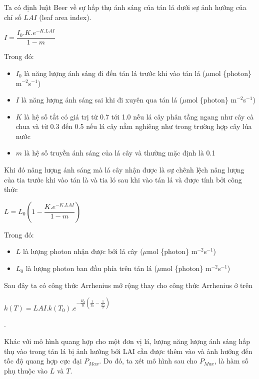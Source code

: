 \documentclass[a4paper]{article}
\begin{document}
    Ta có định luật Beer về sự hấp thụ ánh sáng của tán lá dưới sự ảnh hưởng của chỉ số $LAI$ (leaf area index).
    \begin{center}
        $I = \dfrac{I_0.K.e^{-K.LAI}}{1 - m}$
    \end{center}
    Trong đó:
    \begin{itemize}
        \item $I_0$ là năng lượng ánh sáng đi đến tán lá trước khi vào tán lá ($\mu$mol \{photon\} m$^{-2}$s$^{-1}$)
        \item $I$ là năng lượng ánh sáng sai khi đi xuyên qua tán lá ($\mu$mol \{photon\} m$^{-2}$s$^{-1}$)
        \item $K$ là hệ số tắt có giá trị từ 0.7 tới 1.0 nếu lá cây phân tầng ngang như cây cà chua và từ 0.3 đến 0.5 nếu lá cây nằm nghiêng như trong trường hợp cây lúa nước
        \item $m$ là hệ số truyền ánh sáng của lá cây và thường mặc định là 0.1
    \end{itemize}
    Khi đó năng lượng ánh sáng mà lá cây nhận được là sự chênh lệch năng lượng của tia trước khi vào tán là và tia ló sau khi vào tán lá và được tính bởi công thức
    \begin{center}
        $L = L_0 \left(1 - \dfrac{K.e^{-K.LAI}}{1 - m}\right)$
    \end{center}
    Trong đó:
    \begin{itemize}
        \item $L$ là lượng photon nhận được bởi lá cây ($\mu$mol \{photon\} m$^{-2}$s$^{-1}$)
        \item $L_0$ là lượng photon ban đầu phía trên tán lá ($\mu$mol \{photon\} m$^{-2}$s$^{-1}$)
    \end{itemize}
    
    Sau đây ta có công thức Arrhenius mở rộng thay cho công thức Arrhenius ở trên
    \begin{center}
        $k(T) = LAI.k(T_0).e^{-\frac{H_d}{R}\left(\frac{1}{T_0} - \frac{1}{\frac{H_d}{S}}\right)}$
    \end{center}.
    
    \vspace{5mm}
    
    Khác với mô hình quang hợp cho một đơn vị lá, lượng năng lượng ánh sáng hấp thụ vào trong tán lá bị ảnh hưởng bởi LAI cần được thêm vào và ảnh hưởng đến tốc độ quang hợp cực đại $P_{Max}$. Do đó, ta xét mô hình sau cho $P_{Max}$, là hàm số phụ thuộc vào $L$ và $T$.
    
\end{document}
